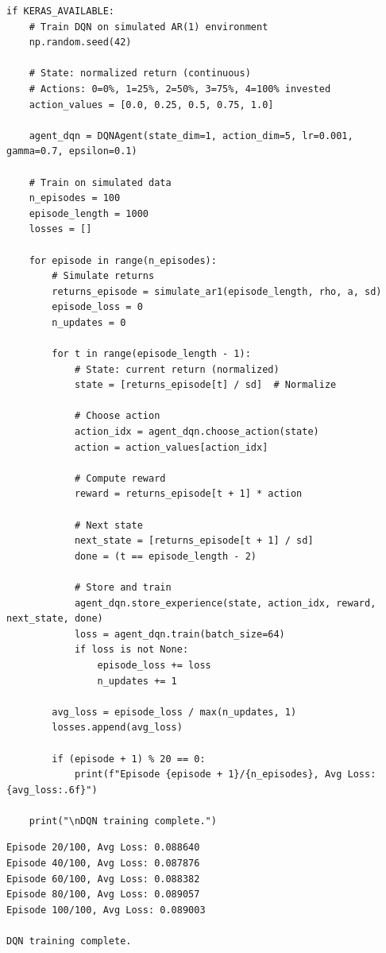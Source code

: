 \begin{verbatim}
if KERAS_AVAILABLE:
    # Train DQN on simulated AR(1) environment
    np.random.seed(42)
    
    # State: normalized return (continuous)
    # Actions: 0=0%, 1=25%, 2=50%, 3=75%, 4=100% invested
    action_values = [0.0, 0.25, 0.5, 0.75, 1.0]
    
    agent_dqn = DQNAgent(state_dim=1, action_dim=5, lr=0.001, gamma=0.7, epsilon=0.1)
    
    # Train on simulated data
    n_episodes = 100
    episode_length = 1000
    losses = []
    
    for episode in range(n_episodes):
        # Simulate returns
        returns_episode = simulate_ar1(episode_length, rho, a, sd)
        episode_loss = 0
        n_updates = 0
        
        for t in range(episode_length - 1):
            # State: current return (normalized)
            state = [returns_episode[t] / sd]  # Normalize
            
            # Choose action
            action_idx = agent_dqn.choose_action(state)
            action = action_values[action_idx]
            
            # Compute reward
            reward = returns_episode[t + 1] * action
            
            # Next state
            next_state = [returns_episode[t + 1] / sd]
            done = (t == episode_length - 2)
            
            # Store and train
            agent_dqn.store_experience(state, action_idx, reward, next_state, done)
            loss = agent_dqn.train(batch_size=64)
            if loss is not None:
                episode_loss += loss
                n_updates += 1
        
        avg_loss = episode_loss / max(n_updates, 1)
        losses.append(avg_loss)
        
        if (episode + 1) % 20 == 0:
            print(f"Episode {episode + 1}/{n_episodes}, Avg Loss: {avg_loss:.6f}")
    
    print("\nDQN training complete.")
\end{verbatim}

\begin{verbatim}
Episode 20/100, Avg Loss: 0.088640
Episode 40/100, Avg Loss: 0.087876
Episode 60/100, Avg Loss: 0.088382
Episode 80/100, Avg Loss: 0.089057
Episode 100/100, Avg Loss: 0.089003

DQN training complete.
\end{verbatim}

